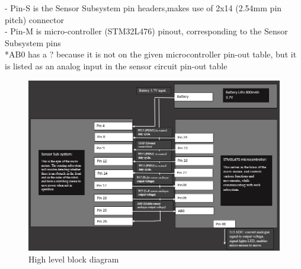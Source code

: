 \documentclass[class=report,11pt,crop=false]{standalone}
\begin{document}
- Pin-S is the Sensor Subsystem pin headers,makes use of 2x14 (2.54mm pin pitch) connector \\
- Pin-M is micro-controller (STM32L476) pinout, corresponding to the Sensor Subsystem pins \\
*AB0 has a ? because it is not on the given microcontroller pin-out table, but it is listed as an analog input in the sensor circuit pin-out table \\
\begin{figure} [h]
    \centering
    \includegraphics[width=1.1\linewidth]{EEE3088F_final_report_latex_template-2//Figures/Interfacing_Diagram.jpg}
    \caption{High level block diagram}
    \label{fig:interface_diagram} 
\end{figure} \FloatBarrier






\end{document}
